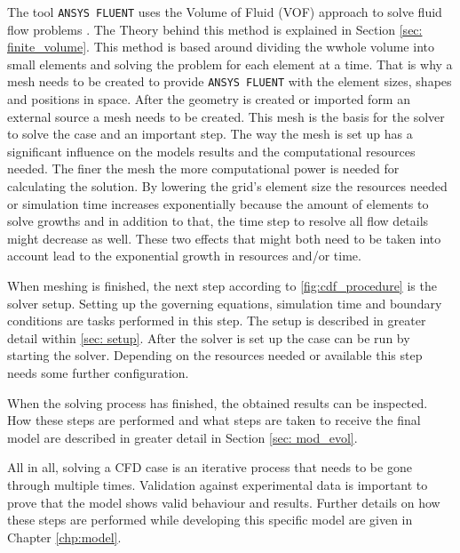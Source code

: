 \documentclass[../thesis.tex]{subfiles}
\begin{document}
The tool \texttt{ANSYS FLUENT} uses the Volume of Fluid (VOF) approach to solve fluid flow problems \cite{manual2009ansys}. The Theory behind this method is explained in Section \ref{sec: finite_volume}. This method is based around dividing the wwhole volume into small elements and solving the problem for each element at a time. That is why a mesh needs to be created to provide \texttt{ANSYS FLUENT} with the element sizes, shapes and positions in space. After the geometry is created or imported form an external source a mesh needs to be created. This mesh is the basis for the solver to solve the case and an important step. The way the mesh is set up has a significant influence on the models results and the computational resources needed. The finer the mesh the more computational power is needed for calculating the solution. By lowering the grid's element size the resources needed or simulation time increases exponentially because the amount of elements to solve growths and in addition to that, the time step to resolve all flow details might decrease as well. These two effects that might both need to be taken into account lead to the exponential growth in resources and/or time.

When meshing is finished, the next step according to \autoref{fig:cdf_procedure} is the solver setup. Setting up the governing equations, simulation time and boundary conditions are tasks performed in this step. The setup is described in greater detail within \autoref{sec: setup}. After the solver is set up the case can be run by starting the solver. Depending on the resources needed or available this step needs some further configuration.

When the solving process has finished, the obtained results can be inspected. How these steps are performed and what steps are taken to receive the final model are described in greater detail in Section \ref{sec: mod_evol}.

All in all, solving a CFD case is an iterative process that needs to be gone through multiple times. Validation against experimental data is important to prove that the model shows valid behaviour and results. Further details on how these steps are performed while developing this specific model are given in Chapter \ref{chp:model}.
\end{document}
